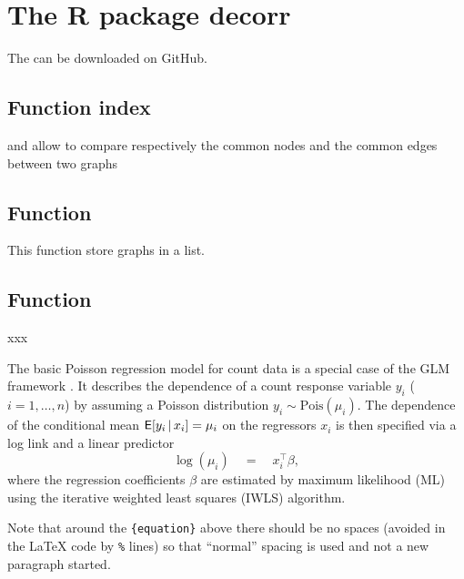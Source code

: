 \documentclass[article]{jss}
\begin{document}
\section{The R package decorr} \label{sec:models}

The  can be downloaded on GitHub.


\subsection{Function index} \label{sec:funct_index}

 and  allow to compare respectively the common nodes and the common edges between two graphs

\subsection{Function } \label{sec:funct_list_dec}

This function store graphs in a list.

\subsection{Function } \label{sec:funct_etc}

xxx


The basic Poisson regression model for count data is a special case of the GLM
framework \cite{McCullagh+Nelder:1989}. It describes the dependence of a count
response variable $y_i$ ($i = 1, \dots, n$) by assuming a Poisson distribution
$y_i \sim \mathrm{Pois}(\mu_i)$. The dependence of the conditional mean
$\mathsf{E}[y_i \, | \, x_i] = \mu_i$ on the regressors $x_i$ is then specified via a
log link and a linear predictor
%
\begin{equation} \label{eq:mean}
\log(\mu_i) \quad = \quad x_i^\top \beta,
\end{equation}
%
where the regression coefficients $\beta$ are estimated by maximum likelihood
(ML) using the iterative weighted least squares (IWLS) algorithm.

\begin{leftbar}
Note that around the \verb|{equation}| above there should be no spaces (avoided
in the {\LaTeX} code by \verb|%| lines) so that ``normal'' spacing is used and
not a new paragraph started.
\end{leftbar}
\end{document}
